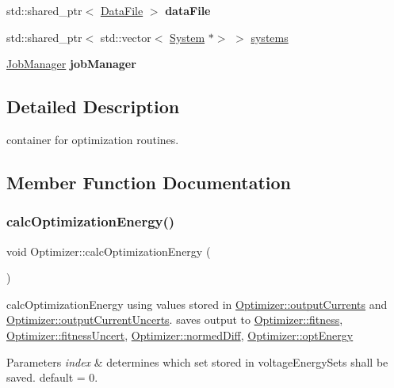 \begin{DoxyCompactItemize}
\item 
\mbox{\label{classOptimizer_a8c0dca31122f1c5abda3b85697922135}} 
std\+::shared\+\_\+ptr$<$ \hyperlink{classDataFile}{Data\+File} $>$ {\bfseries data\+File}
\item 
std\+::shared\+\_\+ptr$<$ std\+::vector$<$ \hyperlink{classSystem}{System} $\ast$$>$ $>$ \hyperlink{classOptimizer_a73db0a3546c6d5fab4237de7dd961f89}{systems}
\item 
\mbox{\label{classOptimizer_a63257684f09c2d4d53c85dfc463aa689}} 
\hyperlink{classJobManager}{Job\+Manager} {\bfseries job\+Manager}
\end{DoxyCompactItemize}


\subsection{Detailed Description}
container for optimization routines. 

\subsection{Member Function Documentation}
\mbox{\label{classOptimizer_a82f53be5481740bf2cc2ff921af38a51}} 
\subsubsection{\texorpdfstring{calc\+Optimization\+Energy()}{calcOptimizationEnergy()}}
{\footnotesize\ttfamily void Optimizer\+::calc\+Optimization\+Energy (\begin{DoxyParamCaption}{ }\end{DoxyParamCaption})\hspace{0.3cm}{\ttfamily [private]}}

calc\+Optimization\+Energy using values stored in \hyperlink{classOptimizer_af36d52fa81a2f38b5cb419e2c800fad6}{Optimizer\+::output\+Currents} and \hyperlink{classOptimizer_a65b7546e16edb4ea05a041812590a873}{Optimizer\+::output\+Current\+Uncerts}. saves output to \hyperlink{classOptimizer_a81991596f83ec6ded5c3b45545cde3cd}{Optimizer\+::fitness}, \hyperlink{classOptimizer_a43a00ff6308575ffdea61f31b5c8bda0}{Optimizer\+::fitness\+Uncert}, \hyperlink{classOptimizer_a30bba218ee4f03978b1b3358a8b3ea62}{Optimizer\+::normed\+Diff}, \hyperlink{classOptimizer_aea24c0bcb76dfd328f6f21b18046891d}{Optimizer\+::opt\+Energy} 
\begin{DoxyParams}{Parameters}
{\em index} & determines which set stored in voltage\+Energy\+Sets shall be saved. default = 0. \\
\hline
\end{DoxyParams}
\mbox{\label{classOptimizer_accdf2a36a2b565ec87f5a251c970520e}} 
